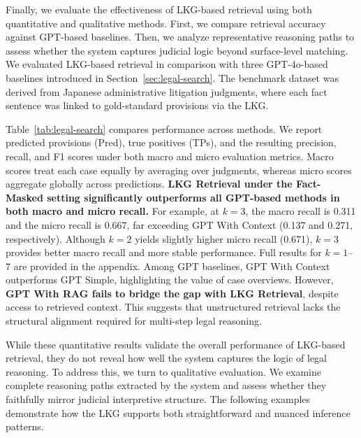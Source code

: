 \documentclass[11pt]{article}
\begin{document}
Finally, we evaluate the effectiveness of LKG-based retrieval using both quantitative and qualitative methods. First, we compare retrieval accuracy against GPT-based baselines. Then, we analyze representative reasoning paths to assess whether the system captures judicial logic beyond surface-level matching.
We evaluated LKG-based retrieval in comparison with three GPT-4o-based baselines introduced in Section~\ref{sec:legal-search}. The benchmark dataset was derived from Japanese administrative litigation judgments, where each fact sentence was linked to gold-standard provisions via the LKG. 





Table~\ref{tab:legal-search} compares performance across methods. We report predicted provisions (Pred), true positives (TPs), and the resulting precision, recall, and F1 scores under both macro and micro evaluation metrics. Macro scores treat each case equally by averaging over judgments, whereas micro scores aggregate globally across predictions.
\textbf{LKG Retrieval under the Fact-Masked setting significantly outperforms all GPT-based methods in both macro and micro recall.} For example, at $k=3$, the macro recall is 0.311 and the micro recall is 0.667, far exceeding GPT With Context (0.137 and 0.271, respectively). Although $k=2$ yields slightly higher micro recall (0.671), $k=3$ provides better macro recall and more stable performance. Full results for $k = 1$--$7$ are provided in the appendix.
Among GPT baselines, GPT With Context outperforms GPT Simple, highlighting the value of case overviews. However, \textbf{GPT With RAG fails to bridge the gap with LKG Retrieval}, despite access to retrieved context. This suggests that unstructured retrieval lacks the structural alignment required for multi-step legal reasoning.


While these quantitative results validate the overall performance of LKG-based retrieval, they do not reveal how well the system captures the logic of legal reasoning. To address this, we turn to qualitative evaluation. We examine complete reasoning paths extracted by the system and assess whether they faithfully mirror judicial interpretive structure. The following examples demonstrate how the LKG supports both straightforward and nuanced inference patterns.
\end{document}
